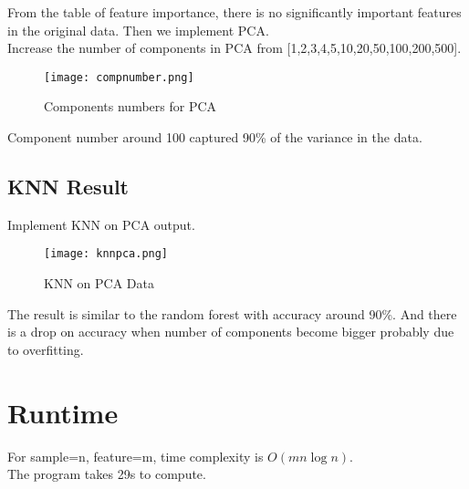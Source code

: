 \documentclass{article}
\begin{document}
From the table of feature importance, there is no significantly important features in the original data. Then we implement PCA.\\
Increase the number of components in PCA from [1,2,3,4,5,10,20,50,100,200,500].\\

\begin{figure}[H]
\centering
\texttt{[image: compnumber.png]}
\caption{Components numbers for PCA}
\label{fig4.2}
\end{figure}

Component number around 100 captured 90\% of the variance in the data.\\



\subsection{KNN Result}
Implement KNN on PCA output.\\

\begin{figure}[H]
\centering
\texttt{[image: knnpca.png]}
\caption{KNN on PCA Data}
\label{fig4.2}
\end{figure}
The result is similar to the random forest with accuracy around 90\%. And there is a drop on accuracy when number of components become bigger probably due to overfitting.\\


\section{Runtime}
For sample=n, feature=m, time complexity is $O(mn \log n)$.\\
The program takes 29s to compute.









%

%

\end{document}
